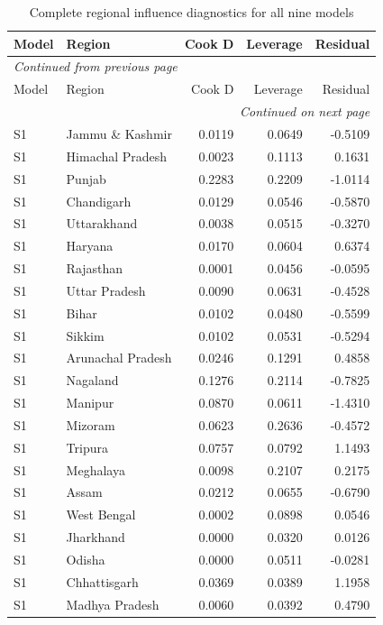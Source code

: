 \documentclass[11pt,a4paper]{report}
\begin{document}
\begingroup\footnotesize\setlength{\tabcolsep}{4pt}
\begin{longtable}{l>{\raggedright\arraybackslash}p{5cm}rrr}
\caption{Complete regional influence diagnostics for all nine models}\\\toprule
Model & Region & Cook D & Leverage & Residual \\\midrule\endfirsthead
\multicolumn{5}{l}{\textit{Continued from previous page}}\\\toprule
Model & Region & Cook D & Leverage & Residual \\\midrule\endhead
\midrule\multicolumn{5}{r}{\textit{Continued on next page}}\\\endfoot\bottomrule\endlastfoot
S1 & Jammu \& Kashmir & 0.0119 & 0.0649 & -0.5109 \\
S1 & Himachal Pradesh & 0.0023 & 0.1113 & 0.1631 \\
S1 & Punjab & 0.2283 & 0.2209 & -1.0114 \\
S1 & Chandigarh & 0.0129 & 0.0546 & -0.5870 \\
S1 & Uttarakhand & 0.0038 & 0.0515 & -0.3270 \\
S1 & Haryana & 0.0170 & 0.0604 & 0.6374 \\
S1 & Rajasthan & 0.0001 & 0.0456 & -0.0595 \\
S1 & Uttar Pradesh & 0.0090 & 0.0631 & -0.4528 \\
S1 & Bihar & 0.0102 & 0.0480 & -0.5599 \\
S1 & Sikkim & 0.0102 & 0.0531 & -0.5294 \\
S1 & Arunachal Pradesh & 0.0246 & 0.1291 & 0.4858 \\
S1 & Nagaland & 0.1276 & 0.2114 & -0.7825 \\
S1 & Manipur & 0.0870 & 0.0611 & -1.4310 \\
S1 & Mizoram & 0.0623 & 0.2636 & -0.4572 \\
S1 & Tripura & 0.0757 & 0.0792 & 1.1493 \\
S1 & Meghalaya & 0.0098 & 0.2107 & 0.2175 \\
S1 & Assam & 0.0212 & 0.0655 & -0.6790 \\
S1 & West Bengal & 0.0002 & 0.0898 & 0.0546 \\
S1 & Jharkhand & 0.0000 & 0.0320 & 0.0126 \\
S1 & Odisha & 0.0000 & 0.0511 & -0.0281 \\
S1 & Chhattisgarh & 0.0369 & 0.0389 & 1.1958 \\
S1 & Madhya Pradesh & 0.0060 & 0.0392 & 0.4790 \\

\end{longtable}
\end{document}
